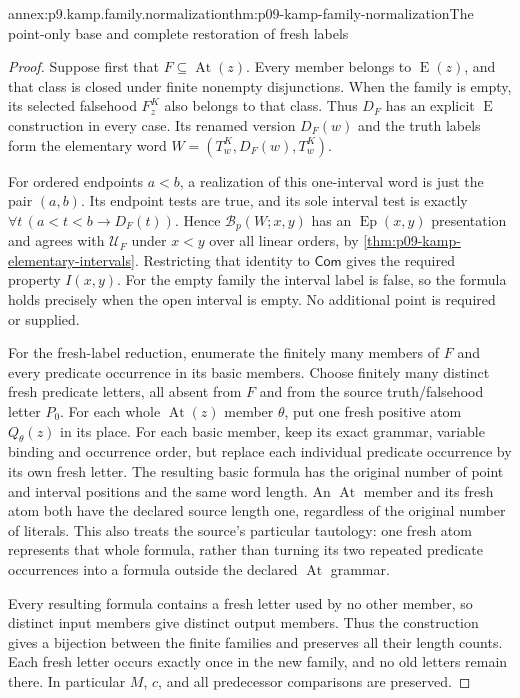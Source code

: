\begin{annexitem}{annex:p9.kamp.family.normalization}{thm:p09-kamp-family-normalization}{The point-only base and complete restoration of fresh labels}
\begin{proof}
Suppose first that \(F\subseteq\operatorname{At}(z)\).
Every member belongs to \(\operatorname{E}(z)\), and that class
is closed under finite nonempty disjunctions. When the family is empty,
its selected falsehood \(F^K_z\) also belongs to that class.
Thus \(D_F\) has an explicit \(\operatorname{E}\) construction
in every case. Its renamed version \(D_F(w)\) and the truth
labels form the elementary word
\(W=(T^K_w,D_F(w),T^K_w)\).

For ordered endpoints \(a<b\), a realization of this one-interval
word is just the pair \((a,b)\). Its endpoint tests are true,
and its sole interval test is exactly
\(\forall t\,(a<t<b\to D_F(t))\). Hence
\(\mathcal B_p(W;x,y)\) has an \(\operatorname{Ep}(x,y)\)
presentation and agrees with \(\mathcal U_F\) under \(x<y\)
over all linear orders, by
\cref{thm:p09-kamp-elementary-intervals}.
Restricting that identity to \(\mathsf{Com}\) gives the required
property \(I(x,y)\). For the empty family the interval label
is false, so the formula holds precisely when the open interval
is empty. No additional point is required or supplied.

For the fresh-label reduction, enumerate the finitely many members of
\(F\) and every predicate occurrence in its basic members. Choose
finitely many distinct fresh predicate letters, all absent from \(F\)
and from the source truth/falsehood letter \(P_0\).
For each whole \(\operatorname{At}(z)\) member \(\theta\),
put one fresh positive atom \(Q_\theta(z)\) in its place.
For each basic member, keep its exact grammar, variable binding and
occurrence order, but replace each individual predicate occurrence by
its own fresh letter. The resulting basic formula has the original
number of point and interval positions and the same word length.
An \(\operatorname{At}\) member and its fresh atom both have
the declared source length one, regardless of the original number
of literals. This also treats the source's particular tautology:
one fresh atom represents that whole formula, rather than turning
its two repeated predicate occurrences into a formula outside the
declared \(\operatorname{At}\) grammar.

Every resulting formula contains a fresh letter used by no other
member, so distinct input members give distinct output members.
Thus the construction gives a bijection between the finite families
and preserves all their length counts. Each fresh letter occurs
exactly once in the new family, and no old letters remain there.
In particular \(M\), \(c\), and all predecessor comparisons
are preserved.


\end{proof}
\end{annexitem}
